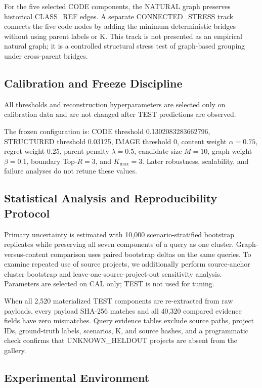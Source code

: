 \documentclass[runningheads]{llncs}
\begin{document}
For the five selected CODE components, the NATURAL graph preserves historical CLASS\_REF edges. A separate CONNECTED\_STRESS track connects the five code nodes by adding the minimum deterministic bridges without using parent labels or K. This track is not presented as an empirical natural graph; it is a controlled structural stress test of graph-based grouping under cross-parent bridges.

\subsection{Calibration and Freeze Discipline}

All thresholds and reconstruction hyperparameters are selected only on calibration data and are not changed after TEST predictions are observed.

The frozen configuration is: CODE threshold 0.1302083283662796, STRUCTURED threshold 0.03125, IMAGE threshold 0, content weight $\alpha=0.75$, regret weight 0.25, parent penalty $\lambda=0.5$, candidate size $M=10$, graph weight $\beta=0.1$, boundary Top-$R=3$, and $K_{\max}=3$. Later robustness, scalability, and failure analyses do not retune these values.

\subsection{Statistical Analysis and Reproducibility Protocol}

Primary uncertainty is estimated with 10,000 scenario-stratified bootstrap replicates while preserving all seven components of a query as one cluster. Graph-versus-content comparison uses paired bootstrap deltas on the same queries. To examine repeated use of source projects, we additionally perform source-anchor cluster bootstrap and leave-one-source-project-out sensitivity analysis. Parameters are selected on CAL only; TEST is not used for tuning.

When all 2,520 materialized TEST components are re-extracted from raw payloads, every payload SHA-256 matches and all 40,320 compared evidence fields have zero mismatches. Query evidence tables exclude source paths, project IDs, ground-truth labels, scenarios, K, and source hashes, and a programmatic check confirms that UNKNOWN\_HELDOUT projects are absent from the gallery.

\subsection{Experimental Environment}
\end{document}
